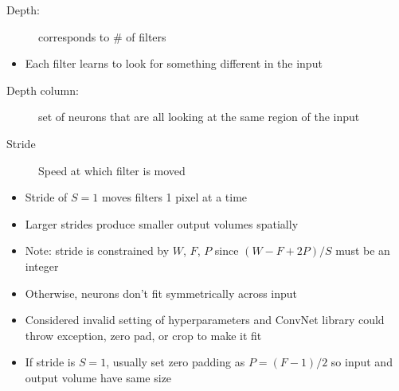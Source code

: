 \documentclass[a4paper,12pt]{article}
\begin{document}
\begin{description}
  \item[Depth:] corresponds to \# of filters
\end{description}
\begin{itemize}
  \item Each filter learns to look for something different in the input
\end{itemize}
\begin{description}
  \item[Depth column:] set of neurons that are all looking at the same region of the input
  \item[Stride] Speed at which filter is moved
\end{description}
\begin{itemize}
  \item Stride of $S = 1$ moves filters 1 pixel at a time
  \item Larger strides produce smaller output volumes spatially
\end{itemize}
\begin{itemize}
  \item Note: stride is constrained by $W$, $F$, $P$ since $(W - F + 2P)/S$ must be an integer
  \item Otherwise, neurons don't fit symmetrically across input
  \item Considered invalid setting of hyperparameters and ConvNet library could throw exception, zero pad, or crop to make it fit
\end{itemize}
\begin{itemize}
  \item If stride is $S=1$, usually set zero padding as $P=(F-1)/2$ so input and output volume have same size
\end{itemize}
\end{document}
